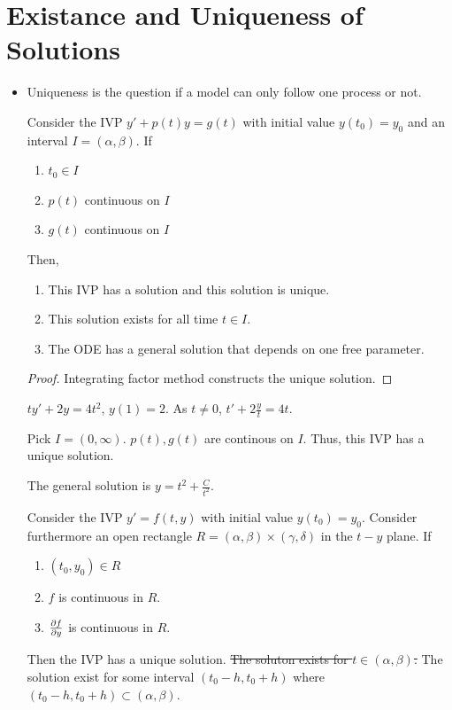 \documentclass[a4paper, 10pt]{article}
\numberwithin{equation}{section}
\begin{document}
\section{Existance and Uniqueness of Solutions}
\begin{itemize}
    \item Uniqueness is the question if a model can only follow one process or not. 
    \begin{theorem}
        Consider the IVP $y'+p(t)y=g(t)$ with initial value $y(t_0)=y_0$ and an interval $I=(\alpha,\beta)$. If 
        \begin{enumerate}
            \item $t_0\in I$
            \item $p(t)$ continuous on $I$
            \item $g(t)$ continuous on $I$
        \end{enumerate}
        Then, 
        \begin{enumerate}
            \item This IVP has a solution and this solution is unique. 
            \item This solution exists for all time $t\in I$. 
            \item The ODE has a general solution that depends on one free parameter.
        \end{enumerate}
        \begin{proof}
            Integrating factor method constructs the unique solution.
        \end{proof}
    \end{theorem}
    \begin{example}
        $ty'+2y=4t^2$, $y(1)=2$. As $t\neq 0$, $t'+2\frac{y}{t}=4t$.
        
        Pick $I=(0,\infty)$. $p(t),g(t)$ are continous on $I$. Thus, this IVP has a unique solution.

        The general solution is $y=t^2+\frac{C}{t^2}$.
    \end{example}
    \begin{theorem}
        Consider the IVP $y'=f(t,y)$ with initial value $y(t_0)=y_0$. Consider furthermore an open rectangle $R=(\alpha,\beta)\times(\gamma,\delta)$ in the $t-y$ plane. If
        \begin{enumerate}
            \item $(t_0,y_0)\in R$
            \item $f$ is continuous in $R$.
            \item $\partialderivative{f}{y}$ is continuous in $R$.
        \end{enumerate}
        Then the IVP has a unique solution. \sout{The soluton exists for $t\in(\alpha,\beta)$.} The solution exist for some interval $(t_0-h,t_0+h)$ where $(t_0-h,t_0+h)\subset(\alpha,\beta)$.
        

\end{theorem}
\end{itemize}
\end{document}
